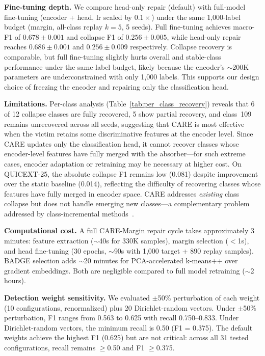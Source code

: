 \documentclass[journal]{IEEEtran}
\newcommand{\ours}{CARE}  %
\begin{document}
\textbf{Fine-tuning depth.}
We compare head-only repair (default) with full-model fine-tuning (encoder + head, lr scaled by $0.1{\times}$) under the same 1{,}000-label budget (margin, all-class replay $k{=}5$, 5 seeds).
Full fine-tuning achieves macro-F1 of $0.678{\pm}0.001$ and collapse F1 of $0.256{\pm}0.005$, while head-only repair reaches $0.686{\pm}0.001$ and $0.256{\pm}0.009$ respectively.
Collapse recovery is comparable, but full fine-tuning slightly hurts overall and stable-class performance under the same label budget, likely because the encoder's ${\sim}$200K parameters are underconstrained with only 1{,}000 labels.
This supports our design choice of freezing the encoder and repairing only the classification head.

\textbf{Limitations.}
Per-class analysis (Table~\ref{tab:per_class_recovery}) reveals that 6 of 12 collapse classes are fully recovered, 5 show partial recovery, and class~109 remains unrecovered across all seeds, suggesting that \ours{} is most effective when the victim retains some discriminative features at the encoder level.
Since \ours{} updates only the classification head, it cannot recover classes whose encoder-level features have fully merged with the absorber---for such extreme cases, encoder adaptation or retraining may be necessary at higher cost.
On QUICEXT-25, the absolute collapse F1 remains low (0.081) despite improvement over the static baseline (0.014), reflecting the difficulty of recovering classes whose features have fully merged in encoder space.
\ours{} addresses \textit{existing} class collapse but does not handle emerging new classes---a complementary problem addressed by class-incremental methods~\cite{cai2024cpn}.

\textbf{Computational cost.}
A full \ours{}-Margin repair cycle takes approximately 3 minutes: feature extraction (${\sim}$40s for 330K samples), margin selection ($<$1s), and head fine-tuning (30 epochs, ${\sim}$90s with 1{,}000 target + 890 replay samples).
BADGE selection adds ${\sim}$20 minutes for PCA-accelerated k-means++ over gradient embeddings.
Both are negligible compared to full model retraining (${\sim}$2 hours).

\textbf{Detection weight sensitivity.}
We evaluated $\pm$50\% perturbation of each weight (10 configurations, renormalized) plus 20 Dirichlet-random vectors.
Under $\pm$50\% perturbation, F1 ranges from 0.563 to 0.625 with recall 0.750--0.833.
Under Dirichlet-random vectors, the minimum recall is 0.50 (F1 = 0.375).
The default weights achieve the highest F1 (0.625) but are not critical: across all 31 tested configurations, recall remains $\geq$0.50 and F1 $\geq$0.375.
\end{document}
